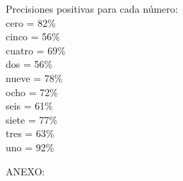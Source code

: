 \documentclass[11pt,a4paper]{report}
\begin{document}
\begin{itemize}
Precisiones positivas para cada número:\\
cero = 82\%\\
cinco = 56\%\\
cuatro = 69\%\\
dos = 56\%\\
nueve = 78\%\\
ocho = 72\%\\
seis = 61\%\\
siete = 77\%\\
tres = 63\%\\
uno = 92\%\\
\end{itemize}

\begin{center}
ANEXO:
\end{center}
\end{document}
